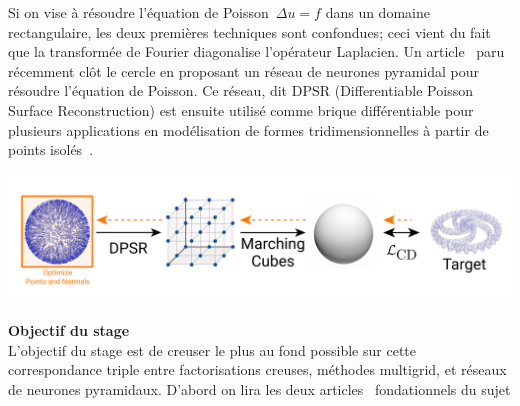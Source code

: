 \documentclass[a4paper,11pt]{article}
\begin{document}
Si on vise à résoudre l'équation de Poisson~$\Delta u = f$ dans un domaine
rectangulaire, les deux premières techniques sont confondues; ceci vient du
fait que la transformée de Fourier diagonalise l'opérateur Laplacien.
Un article~\cite{sap} paru récemment
clôt le cercle en proposant un réseau
de neurones pyramidal pour résoudre l'équation de Poisson.
Ce réseau, dit DPSR (Differentiable Poisson Surface Reconstruction) est ensuite
utilisé comme brique différentiable pour plusieurs applications en modélisation
de formes tridimensionnelles à partir de points isolés~\cite{psr}.
\\
\centerline{%
	\includegraphics[width=0.8\linewidth]{f/pipeline_optim.png}%
}



{\bf Objectif du stage}\\
L'objectif du stage est de creuser le plus au fond possible sur cette
correspondance triple entre factorisations creuses, méthodes multigrid, et
réseaux de neurones pyramidaux.  D'abord on lira les deux
articles~\cite{psr,sap} fondationnels du sujet


\end{document}
